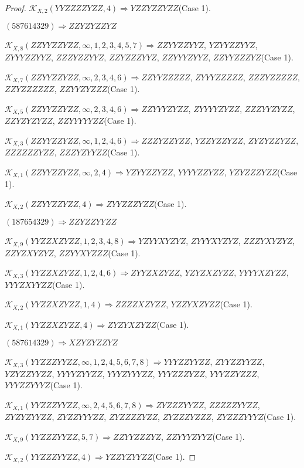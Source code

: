 \documentclass[12pt]{article}
\theoremstyle{plain}
\theoremstyle{definition}
\theoremstyle{remark}
\newcommand{\fancy}[1]{\mathcal{#1}}
\def\K{\fancy{K}}
\begin{document}
\begin{proof}
	$\K_{X,2}(YYZZZZYZZ,4)\Rightarrow $$YZZYZZYZZ$(Case 1).
	
	
	
	$(5 8 7 6 1 4 3 2 9)\Rightarrow ZZYZYZZYZ$
	
	
	$\K_{X,8}(ZZYYZZYZZ,\infty,1, 2, 3, 4, 5, 7)\Rightarrow $$ZZYYZZYYZ$, $YZYYZZYYZ$, $ZYYYZZYYZ$, $ZZZYZZYYZ$, $ZZYZZZYYZ$, $ZZYYYZYYZ$, $ZZYYZZZYZ$(Case 1).
	
	$\K_{X,7}(ZZYYZZYZZ,\infty,2, 3, 4, 6)\Rightarrow $$ZZYYZZZZZ$, $ZYYYZZZZZ$, $ZZZYZZZZZ$, $ZZYZZZZZZ$, $ZZYYZYZZZ$(Case 1).
	
	$\K_{X,5}(ZZYYZZYZZ,\infty,2, 3, 4, 6)\Rightarrow $$ZZYYYZYZZ$, $ZYYYYZYZZ$, $ZZZYYZYZZ$, $ZZYZYZYZZ$, $ZZYYYYYZZ$(Case 1).
	
	$\K_{X,3}(ZZYYZZYZZ,\infty,1, 2, 4, 6)\Rightarrow $$ZZZYZZYZZ$, $YZZYZZYZZ$, $ZYZYZZYZZ$, $ZZZZZZYZZ$, $ZZZYZYYZZ$(Case 1).
	
	$\K_{X,1}(ZZYYZZYZZ,\infty,2, 4)\Rightarrow $$YZYYZZYZZ$, $YYYYZZYZZ$, $YZYZZZYZZ$(Case 1).
	
	$\K_{X,2}(ZZYYZZYZZ,4)\Rightarrow $$ZYYZZZYZZ$(Case 1).
	
	
	
	$(1 8 7 6 5 4 3 2 9)\Rightarrow ZZYZZYYZZ$
	
	
	$\K_{X,9}(YYZZXZYZZ,1, 2, 3, 4, 8)\Rightarrow $$YZYYXYZYZ$, $ZYYYXYZYZ$, $ZZZYXYZYZ$, $ZZYZXYZYZ$, $ZZYYXYZZZ$(Case 1).
	
	$\K_{X,3}(YYZZXZYZZ,1, 2, 4, 6)\Rightarrow $$ZYYZXZYZZ$, $YZYZXZYZZ$, $YYYYXZYZZ$, $YYYZXYYZZ$(Case 1).
	
	$\K_{X,2}(YYZZXZYZZ,1, 4)\Rightarrow $$ZZZZXZYZZ$, $YZZYXZYZZ$(Case 1).
	
	$\K_{X,1}(YYZZXZYZZ,4)\Rightarrow $$ZYZYXZYZZ$(Case 1).
	
	
	
	$(5 8 7 6 1 4 3 2 9)\Rightarrow XZYZYZZYZ$
	
	
	$\K_{X,3}(YYZZZYYZZ,\infty,1, 2, 4, 5, 6, 7, 8)\Rightarrow $$YYYZZYYZZ$, $ZYYZZYYZZ$, $YZYZZYYZZ$, $YYYYZYYZZ$, $YYYZYYYZZ$, $YYYZZZYZZ$, $YYYZZYZZZ$, $YYYZZYYYZ$(Case 1).
	
	$\K_{X,1}(YYZZZYYZZ,\infty,2, 4, 5, 6, 7, 8)\Rightarrow $$ZYZZZYYZZ$, $ZZZZZYYZZ$, $ZYZYZYYZZ$, $ZYZZYYYZZ$, $ZYZZZZYZZ$, $ZYZZZYZZZ$, $ZYZZZYYYZ$(Case 1).
	
	$\K_{X,9}(YYZZZYYZZ,5, 7)\Rightarrow $$ZZYYZZZYZ$, $ZZYYYZYYZ$(Case 1).
	
	$\K_{X,2}(YYZZZYYZZ,4)\Rightarrow $$YZZYZYYZZ$(Case 1).
	
	
	

\end{proof}
\end{document}
